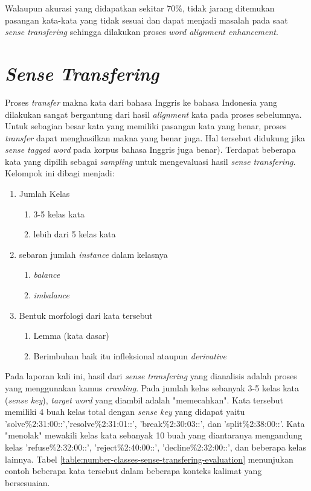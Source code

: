 Walaupun akurasi yang didapatkan sekitar 70\%, tidak jarang ditemukan pasangan kata-kata yang tidak sesuai dan dapat menjadi masalah pada saat \textit{sense transfering} sehingga dilakukan proses \textit{word alignment enhancement}.

\section{\textit{Sense Transfering}}

Proses \textit{transfer} makna kata dari bahasa Inggris ke bahasa Indonesia yang dilakukan sangat bergantung dari hasil \textit{alignment} kata pada proses sebelumnya. Untuk sebagian besar kata yang memiliki pasangan kata yang benar, proses \textit{transfer} dapat menghasilkan makna yang benar juga. Hal tersebut didukung jika \textit{sense tagged word} pada korpus bahasa Inggris juga benar). Terdapat beberapa kata yang dipilih sebagai \textit{sampling} untuk mengevaluasi hasil \textit{sense transfering}. Kelompok ini dibagi menjadi:

\begin{enumerate}
	\item Jumlah Kelas
	\begin{enumerate}
		\item 3-5 kelas kata
		\item lebih dari 5 kelas kata
	\end{enumerate}
	\item sebaran jumlah \textit{instance} dalam kelasnya
	\begin{enumerate}
		\item \textit{balance}
		\item \textit{imbalance}
	\end{enumerate}
	\item Bentuk morfologi dari kata tersebut
	\begin{enumerate}
		\item Lemma (kata dasar)
		\item Berimbuhan baik itu infleksional ataupun \textit{derivative}
	\end{enumerate}
\end{enumerate}

Pada laporan kali ini, hasil dari \textit{sense transfering} yang dianalisis adalah proses yang menggunakan kamus \textit{crawling}. Pada jumlah kelas sebanyak 3-5 kelas kata (\textit{sense key}), \textit{target word} yang diambil adalah "memecahkan". Kata tersebut memiliki 4 buah kelas total dengan \textit{sense key} yang didapat yaitu 'solve\%2:31:00::','resolve\%2:31:01::', 'break\%2:30:03::', dan 'split\%2:38:00::'. Kata "menolak" mewakili kelas kata sebanyak 10 buah yang diantaranya mengandung kelas 'refuse\%2:32:00::', 'reject\%2:40:00::', 'decline\%2:32:00::', dan beberapa kelas lainnya. Tabel \ref{table:number-classes-sense-transfering-evaluation} menunjukan contoh beberapa kata tersebut dalam beberapa konteks kalimat yang bersesuaian.

